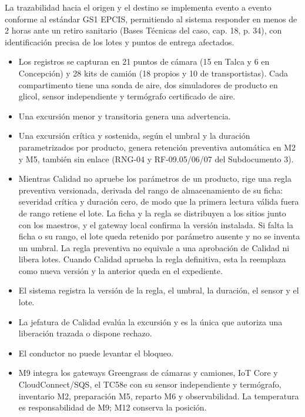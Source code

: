 La trazabilidad hacia el origen y el destino se implementa evento a evento conforme al estándar GS1 EPCIS, permitiendo al sistema responder en menos de 2 horas ante un retiro sanitario (Bases Técnicas del caso, cap. 18, p. 34), con identificación precisa de los lotes y puntos de entrega afectados.

\begin{itemize}
  \item Los registros se capturan en 21 puntos de cámara (15 en Talca y 6 en Concepción) y 28 kits de camión (18 propios y 10 de transportistas). Cada compartimento tiene una sonda de aire, dos simuladores de producto en glicol, sensor independiente y termógrafo certificado de aire.
  \item Una excursión menor y transitoria genera una advertencia.
  \item Una excursión crítica y sostenida, según el umbral y la duración parametrizados por producto, genera retención preventiva automática en M2 y M5, también sin enlace (RNG-04 y RF-09.05/06/07 del Subdocumento 3).
  \item Mientras Calidad no apruebe los parámetros de un producto, rige una regla preventiva versionada, derivada del rango de almacenamiento de su ficha: severidad crítica y duración cero, de modo que la primera lectura válida fuera de rango retiene el lote. La ficha y la regla se distribuyen a los sitios junto con los maestros, y el gateway local confirma la versión instalada. Si falta la ficha o su rango, el lote queda retenido por parámetro ausente y no se inventa un umbral. La regla preventiva no equivale a una aprobación de Calidad ni libera lotes. Cuando Calidad aprueba la regla definitiva, esta la reemplaza como nueva versión y la anterior queda en el expediente.
  \item El sistema registra la versión de la regla, el umbral, la duración, el sensor y el lote.
  \item La jefatura de Calidad evalúa la excursión y es la única que autoriza una liberación trazada o dispone rechazo.
  \item El conductor no puede levantar el bloqueo.
  \item M9 integra los gateways Greengrass de cámaras y camiones, IoT Core y CloudConnect/SQS, el TC58e con su sensor independiente y termógrafo, inventario M2, preparación M5, reparto M6 y observabilidad. La temperatura es responsabilidad de M9; M12 conserva la posición.
\end{itemize}

